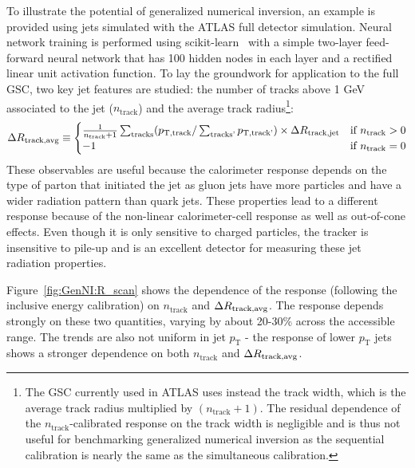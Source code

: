 To illustrate the potential of generalized numerical inversion, an example is provided using jets simulated with the ATLAS full detector simulation.  Neural network training is performed using scikit-learn~\cite{scikit-learn} with a simple two-layer feed-forward neural network that has 100 hidden nodes in each layer and a rectified linear unit activation function.  To lay the groundwork for application to the full GSC, two key jet features are studied: the number of tracks above 1 GeV associated to the jet ($n_\text{track}$) and the average track radius\footnote{The GSC currently used in ATLAS uses instead the track width, which is the average track radius multiplied by $(n_\text{track}+1)$.  The residual dependence of the $n_\text{track}$-calibrated response on the track width is negligible and is thus not useful for benchmarking generalized numerical inversion as the sequential calibration is nearly the same as the simultaneous calibration. 
}:
\[
\Delta R_\text{track,avg} \equiv
\begin{cases}
  \frac{1}{n_\text{track}+1}\sum_\text{tracks}(p_\text{T,track}/\sum_\text{tracks'} p_\text{T,track'})\times \Delta R_\text{track,jet} & \text{if $n_\text{track}>0$}\\
  -1 & \text{if $n_\text{track}=0$}
\end{cases}
\]
These observables are useful because the calorimeter response depends on the type of parton that initiated the jet as gluon jets have more particles and have a wider radiation pattern than quark jets.  These properties lead to a different response because of the non-linear calorimeter-cell response as well as out-of-cone effects.  Even though it is only sensitive to charged particles, the tracker is insensitive to pile-up and is an excellent detector for measuring these jet radiation properties.

Figure~\ref{fig:GenNI:R_scan} shows the dependence of the response (following the inclusive energy calibration) on $n_\text{track}$ and $\Delta R_\text{track,avg}$.  The response depends strongly on these two quantities, varying by about  20-30\% across the accessible range.  The trends are also not uniform in jet $p_\text{T}$ - the response of lower $p_\text{T}$ jets shows a stronger dependence on both $n_\text{track}$ and $\Delta R_\text{track,avg}$.



